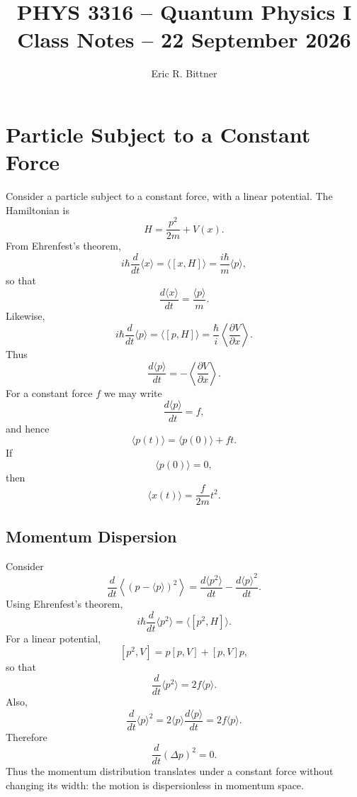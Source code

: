 \documentclass[11pt]{article}
\title{\textbf{PHYS 3316 -- Quantum Physics I}\\
Class Notes -- 22 September 2026}
\author{Eric R. Bittner}
\date{}
\begin{document}
\maketitle
\section{Particle Subject to a Constant Force}
Consider a particle subject to a constant force, with a linear potential.
The Hamiltonian is
\[
H=\frac{p^2}{2m}+V(x).
\]
From Ehrenfest's theorem,
\[
i\hbar\frac{d}{dt}\langle x\rangle
=
\langle[x,H]\rangle
=
\frac{i\hbar}{m}\langle p\rangle,
\]
so that
\[
\boxed{
\frac{d\langle x\rangle}{dt}
=
\frac{\langle p\rangle}{m}.
}
\]
Likewise,
\[
i\hbar\frac{d}{dt}\langle p\rangle
=
\langle[p,H]\rangle
=
\frac{\hbar}{i}
\left\langle\frac{\partial V}{\partial x}\right\rangle.
\]
Thus
\[
\boxed{
\frac{d\langle p\rangle}{dt}
=
-\left\langle\frac{\partial V}{\partial x}\right\rangle.
}
\]
For a constant force $f$ we may write
\[
\frac{d\langle p\rangle}{dt}=f,
\]
and hence
\[
\langle p(t)\rangle
=
\langle p(0)\rangle+ft.
\]
If
\[
\langle p(0)\rangle=0,
\]
then
\[
\langle x(t)\rangle
=
\frac{f}{2m}t^2.
\]
\subsection{Momentum Dispersion}
Consider
\[
\frac{d}{dt}
\left\langle
(p-\langle p\rangle)^2
\right\rangle
=
\frac{d\langle p^2\rangle}{dt}
-
\frac{d\langle p\rangle^2}{dt}.
\]
Using Ehrenfest's theorem,
\[
i\hbar\frac{d}{dt}\langle p^2\rangle
=
\langle[p^2,H]\rangle.
\]
For a linear potential,
\[
[p^2,V]
=
p[p,V]+[p,V]p,
\]
so that
\[
\frac{d}{dt}\langle p^2\rangle
=
2f\langle p\rangle.
\]
Also,
\[
\frac{d}{dt}\langle p\rangle^2
=
2\langle p\rangle
\frac{d\langle p\rangle}{dt}
=
2f\langle p\rangle.
\]
Therefore
\[
\boxed{
\frac{d}{dt}(\Delta p)^2=0.
}
\]
Thus the momentum distribution translates under a constant force without
changing its width: the motion is dispersionless in momentum space.
\end{document}
